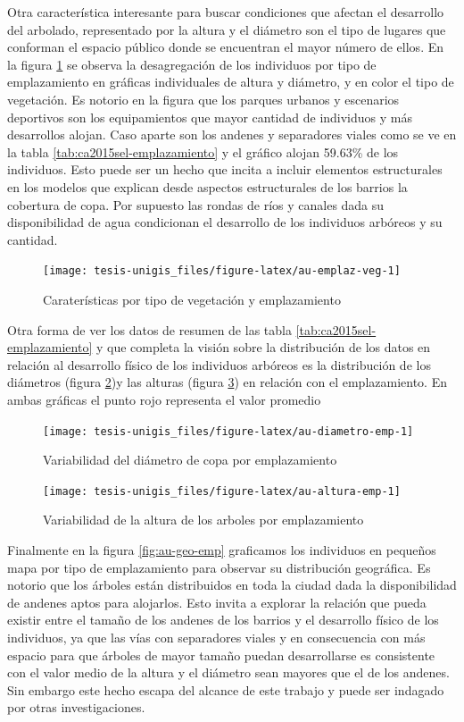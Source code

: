 \documentclass[12pt,]{book}
\begin{document}
Otra característica interesante para buscar condiciones que afectan el
desarrollo del arbolado, representado por la altura y el diámetro son el
tipo de lugares que conforman el espacio público donde se encuentran el
mayor número de ellos. En la figura \ref{fig:au-emplaz-veg} se observa
la desagregación de los individuos por tipo de emplazamiento en gráficas
individuales de altura y diámetro, y en color el tipo de vegetación. Es
notorio en la figura que los parques urbanos y escenarios deportivos son
los equipamientos que mayor cantidad de individuos y más desarrollos
alojan. Caso aparte son los andenes y separadores viales como se ve en
la tabla \ref{tab:ca2015sel-emplazamiento} y el gráfico alojan 59.63\%
de los individuos. Esto puede ser un hecho que incita a incluir
elementos estructurales en los modelos que explican desde aspectos
estructurales de los barrios la cobertura de copa. Por supuesto las
rondas de ríos y canales dada su disponibilidad de agua condicionan el
desarrollo de los individuos arbóreos y su cantidad.

\begin{figure}
\texttt{[image: tesis-unigis\_files/figure-latex/au-emplaz-veg-1]} \caption{Caraterísticas por tipo de vegetación y emplazamiento}\label{fig:au-emplaz-veg}
\end{figure}

Otra forma de ver los datos de resumen de las tabla
\ref{tab:ca2015sel-emplazamiento} y que completa la visión sobre la
distribución de los datos en relación al desarrollo físico de los
individuos arbóreos es la distribución de los diámetros (figura
\ref{fig:au-diametro-emp})y las alturas (figura \ref{fig:au-altura-emp})
en relación con el emplazamiento. En ambas gráficas el punto rojo
representa el valor promedio

\begin{figure}
\texttt{[image: tesis-unigis\_files/figure-latex/au-diametro-emp-1]} \caption{Variabilidad del diámetro de copa por emplazamiento}\label{fig:au-diametro-emp}
\end{figure}

\begin{figure}
\texttt{[image: tesis-unigis\_files/figure-latex/au-altura-emp-1]} \caption{Variabilidad de la altura de los arboles por emplazamiento}\label{fig:au-altura-emp}
\end{figure}

Finalmente en la figura \ref{fig:au-geo-emp} graficamos los individuos
en pequeños mapa por tipo de emplazamiento para observar su distribución
geográfica. Es notorio que los árboles están distribuidos en toda la
ciudad dada la disponibilidad de andenes aptos para alojarlos. Esto
invita a explorar la relación que pueda existir entre el tamaño de los
andenes de los barrios y el desarrollo físico de los individuos, ya que
las vías con separadores viales y en consecuencia con más espacio para
que árboles de mayor tamaño puedan desarrollarse es consistente con el
valor medio de la altura y el diámetro sean mayores que el de los
andenes. Sin embargo este hecho escapa del alcance de este trabajo y
puede ser indagado por otras investigaciones.
\end{document}
